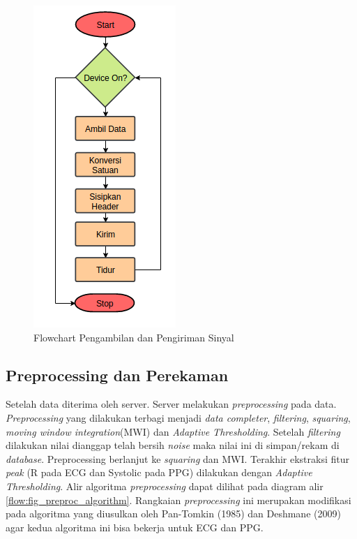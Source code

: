 \begin{figure}[H]
\centering
\includegraphics[scale=0.8]{images/flow_sample.png}
\caption{Flowchart Pengambilan dan Pengiriman Sinyal}
\label{flow:flow_sample}
\end{figure}

\subsection{Preprocessing dan Perekaman}
Setelah data diterima oleh server. Server melakukan \textit{preprocessing} pada data. \textit{Preprocessing} yang dilakukan terbagi menjadi \textit{data completer}, \textit{filtering}, \textit{squaring}, \textit{moving window integration}(MWI) dan \textit{Adaptive Thresholding}. Setelah \textit{filtering} dilakukan nilai dianggap telah bersih \textit{noise} maka nilai ini di simpan/rekam di \textit{database}. Preprocessing berlanjut ke \textit{squaring} dan MWI. Terakhir ekstraksi fitur \textit{peak} (R pada ECG dan Systolic pada PPG) dilakukan dengan \textit{Adaptive Thresholding}. Alir algoritma \textit{preprocessing} dapat dilihat pada diagram alir \ref{flow:fig_preproc_algorithm}. Rangkaian \textit{preprocessing} ini merupakan modifikasi pada algoritma yang diusulkan oleh Pan-Tomkin (1985) dan Deshmane (2009) agar kedua algoritma ini bisa bekerja untuk ECG dan PPG.

